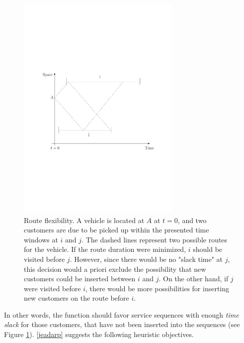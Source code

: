 \documentclass[dissertation,draft*]{aaltoseries}
\begin{document}
\begin{figure}[ht]
\begin{center}
\includegraphics[width=0.7\textwidth]{flexibility03.pdf}
\caption{Route flexibility. A vehicle is located at $A$ at $t = 0$,
and two customers are due to be picked up within the presented time windows at $i$ and $j$.
The dashed lines represent two possible routes for the vehicle.
If the route duration were minimized, $i$ should be visited before $j$. However, since
there would be no "slack time" at $j$, this decision would a priori 
exclude the possibility that new customers could be inserted between $i$ and $j$. 
On the other hand, if $j$ were visited before $i$, there would be
more possibilities for inserting new customers on the route before $i$. }
\label{flexibility01}
\end{center}
\end{figure}


In other words, the function should favor service sequences with enough 
\emph{time slack} for those customers, that have not been inserted into the sequences (see Figure \ref{flexibility01}).
\ref{jeadarp} suggests the following heuristic objectives.

% 
\end{document}
